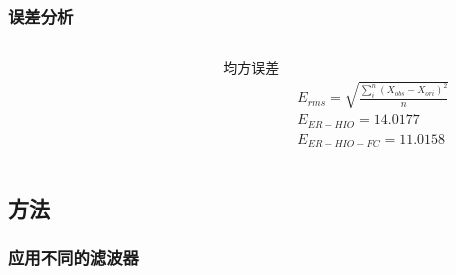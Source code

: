 \documentclass[12pt,aspectratio=169]{beamer} %
\begin{document}
\begin{frame}
    \frametitle{误差分析}
    \begin{columns}
        \begin{column}{0.7\textwidth}
            \begin{figure}
                \qquad
            \end{figure}
        \end{column}
        \begin{column}{0.3\textwidth}
            \begin{block}{均方误差}
                \small \begin{align*}
                    &E_{rms}=\sqrt{\frac{\sum_i^n (X_{obs}-X_{ori})^2}{n}}\\
                    &E_{ER-HIO}=14.0177\\
                    &E_{ER-HIO-FC}=11.0158
                \end{align*}
            \end{block}
        \end{column}
    \end{columns}
\end{frame}

\subsection{方法}

\begin{frame}
    \frametitle{应用不同的滤波器}
        \begin{figure}
            
        \end{figure}
    

\end{frame}
\end{document}
